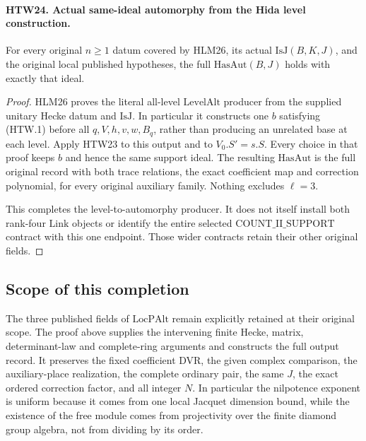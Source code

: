 \paragraph{HTW24. Actual same-ideal automorphy from the Hida level construction.}
\label{claim:HTW24}
For every original \(n\ge1\) datum covered by HLM26,
its actual \(\mathrm{IsJ}(B,K,J)\), and the original
local published hypotheses, the full
\(\mathrm{HasAut}(B,J)\) holds with exactly that ideal.
\begin{proof}
HLM26 proves the literal all-level
\(\mathrm{LevelAlt}\) producer from the supplied
unitary Hecke datum and \(\mathrm{IsJ}\).  In
particular it constructs one \(b\) satisfying
(HTW.1) before all \(q,V,h,v,w,B_q\), rather
than producing an unrelated base at each level.
Apply HTW23 to this output and to
\(V_0.S'=s.S\).  Every choice in that proof
keeps \(b\) and hence the same support ideal.
The resulting \(\mathrm{HasAut}\) is the full
original record with both trace relations,
the exact coefficient map and correction
polynomial, for every original auxiliary
family.  Nothing excludes \(\ell=3\).

This completes the level-to-automorphy producer.
It does not itself install both rank-four
\(\mathrm{Link}\) objects or identify the
entire selected \(\mathrm{COUNT\_II\_SUPPORT}\)
contract with this one endpoint.  Those wider
contracts retain their other original fields.
\end{proof}

\subsection{Scope of this completion}

The three published fields of \(\mathrm{LocPAlt}\)
remain explicitly retained at their original scope.
The proof above supplies the intervening finite
Hecke, matrix, determinant-law and complete-ring
arguments and constructs the full output record.
It preserves the fixed coefficient DVR, the
given complex comparison, the auxiliary-place
realization, the complete ordinary pair, the
same \(J\), the exact ordered correction factor,
and all integer \(N\).  In particular the
nilpotence exponent is uniform because it
comes from one local Jacquet dimension bound,
while the existence of the free module comes
from projectivity over the finite diamond
group algebra, not from dividing by its order.
